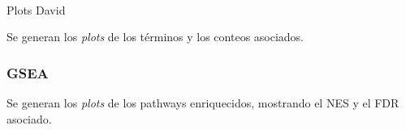 \documentclass[
  12pt,
  letterpaper,
  DIV=11,
  numbers=noendperiod]{scrartcl}
\makeatletter
\let\oldparagraph\paragraph
\renewcommand{\paragraph}{
    \@ifstar
      \xxxParagraphStar
      \xxxParagraphNoStar
  }
\newcommand{\xxxParagraphStar}[1]{\oldparagraph*{#1}\mbox{}}
\newcommand{\xxxParagraphNoStar}[1]{\oldparagraph{#1}\mbox{}}
\makeatother
\begin{document}
\paragraph{Plots David}\label{plots-david}

Se generan los \emph{plots} de los términos y los conteos asociados.

\subsubsection{GSEA}\label{gsea}

Se generan los \emph{plots} de los pathways enriquecidos, mostrando el
NES y el FDR asociado.
\end{document}
